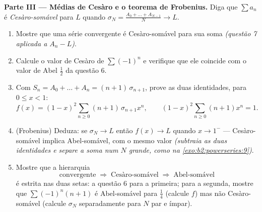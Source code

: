 \begin{problem}
\medskip
\noindent\textbf{Parte III --- Médias de Cesàro e o teorema de
Frobenius.} Diga que $\sum a_n$ é \emph{Cesàro-somável} para $L$ quando
$\sigma_N = \frac{A_0 + \dots + A_{N-1}}{N} \to L$.
\begin{enumerate}[resume]
  \item Mostre que uma série convergente é Cesàro-somável para
        sua soma \emph{(questão 7 aplicada a $A_n - L$)}.
  \item Calcule o valor de Cesàro de $\sum(-1)^n$ e verifique que ele
        coincide com o valor de Abel $\frac12$ da questão 6.
  \item Com $S_n = A_0 + \dots + A_n = (n+1)\,\sigma_{n+1}$,
        prove as duas identidades, para $0 \leq x < 1$:
        \[
        f(x) = (1-x)^2\sum_{n\geq0}(n+1)\,\sigma_{n+1}x^n,
        \qquad
        (1-x)^2\sum_{n\geq0}(n+1)x^n = 1 .
        \]
  \item (Frobenius) Deduza: se $\sigma_N \to L$ então $f(x) \to
        L$ quando $x \to 1^-$ --- Cesàro-somável implica
        Abel-somável, com o mesmo valor \emph{(subtraia as duas
        identidades e separe a soma num $N$ grande, como na
        \cref{exo:b2:powerseries:9})}.
  \item Mostre que a hierarquia
        \[
        \text{convergente} \;\Longrightarrow\;
        \text{Cesàro-somável} \;\Longrightarrow\;
        \text{Abel-somável}
        \]
        é estrita nas duas setas: a questão 6 para a primeira;
        para a segunda, mostre que $\sum(-1)^n(n+1)$ é
        Abel-somável para $\frac14$ (calcule $f$) mas não
        Cesàro-somável (calcule $\sigma_N$ separadamente para
        $N$ par e ímpar).
\end{enumerate}


\end{problem}
